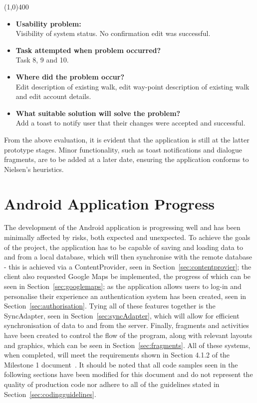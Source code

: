 \documentclass[11pt,a4paper]{article}
\begin{document}
\line(1,0){400}

\begin{itemize}
	\item\textbf{Usability problem:}\\
	Visibility of system status. No confirmation edit was successful.

	\item\textbf{Task attempted when problem occurred?}\\
	Task 8, 9 and 10.

	\item\textbf{Where did the problem occur?}\\
	Edit description of existing walk, edit way-point description of existing walk and edit account details.

	\item\textbf{What suitable solution will solve the problem?}\\
	Add a toast to notify user that their changes were accepted and successful.

\end{itemize}

From the above evaluation, it is evident that the application is still at the latter prototype stages. Minor functionality, such as toast notifications and dialogue fragments, are to be added at a later date, ensuring the application conforms to Nielsen's heuristics.



\section{Android Application Progress}
The development of the Android application is progressing well and has been minimally affected by risks, both expected and unexpected. To achieve the goals of the project, the application has to be capable of saving and loading data to and from a local database, which will then synchronise with the remote database - this is achieved via a ContentProvider, seen in Section~\ref{sec:contentprovier}; the client also requested Google Maps be implemented, the progress of which can be seen in Section~\ref{sec:googlemaps}; as the application allows users to log-in and personalise their experience an authentication system has been created, seen in Section~\ref{sec:authorisation}. Tying all of these features together is the SyncAdapter, seen in Section~\ref{sec:syncAdapter}, which will allow for efficient synchronisation of data to and from the server. Finally, fragments and activities have been created to control the flow of the program, along with relevant layouts and graphics, which can be seen in Section~\ref{sec:fragments}. All of these systems, when completed, will meet the requirements shown in Section 4.1.2 of the Milestone 1 document~\cite{initialDoc}. It should be noted that all code samples seen in the following sections have been modified for this document and do not represent the quality of production code nor adhere to all of the guidelines stated in Section~\ref{sec:codingguidelines}.
\end{document}

